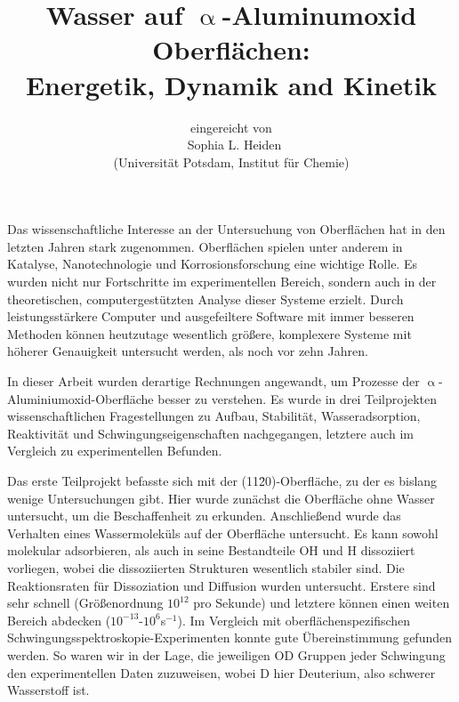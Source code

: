 \documentclass[11pt,DIV=13,a4paper,headinclude,german]{scrartcl}
\begin{document}
\titlehead{\centering\normalfont\large\scshape Allgemeinverständliche Zusammenfassung}
\title{\Large\vspace{-\baselineskip} Wasser auf $\upalpha$-Aluminumoxid Oberflächen:\\
  Energetik, Dynamik and Kinetik\vspace{0\baselineskip}}
\author{\large\sffamily eingereicht von\\
  \Large\textbf\sffamily\ Sophia L. Heiden\\
  \large\sffamily (Universit\"{a}t Potsdam, Institut f\"{u}r Chemie)}
\date{}
\maketitle
\vspace{-1cm}
Das wissenschaftliche Interesse an der Untersuchung von Oberflächen hat in den letzten Jahren stark zugenommen.
Oberflächen spielen unter anderem in Katalyse, Nanotechnologie und Korrosionsforschung eine wichtige Rolle.
Es wurden nicht nur Fortschritte im experimentellen Bereich, sondern auch in der theoretischen, computergestützten Analyse dieser Systeme erzielt.
Durch leistungsstärkere Computer und ausgefeiltere Software mit immer besseren Methoden können heutzutage wesentlich größere, komplexere Systeme mit höherer Genauigkeit untersucht werden, als noch vor zehn Jahren.

In dieser Arbeit wurden derartige Rechnungen angewandt, um Prozesse der $\upalpha$-Aluminiumoxid-Oberfläche besser zu verstehen.
Es wurde in drei Teilprojekten wissenschaftlichen Fragestellungen zu Aufbau, Stabilität, Wasseradsorption, Reaktivität und Schwingungseigenschaften nachgegangen, letztere auch im Vergleich zu experimentellen Befunden.

Das erste Teilprojekt befasste sich mit der (11\=20)-Oberfläche, zu der es bislang wenige Untersuchungen gibt.
Hier wurde zunächst die Oberfläche ohne Wasser %
untersucht, um die Beschaffenheit zu erkunden.
Anschließend wurde das Verhalten eines Wassermoleküls auf der Oberfläche untersucht.
Es kann sowohl molekular adsorbieren, als auch in seine Bestandteile OH und H dissoziiert vorliegen, wobei die dissoziierten Strukturen wesentlich stabiler sind.
Die Reaktionsraten für Dissoziation und Diffusion wurden untersucht. Erstere sind sehr schnell (Größenordnung $10^{12}$ pro Sekunde) und letztere können einen weiten Bereich abdecken ($10^{-13}$-$10^6$s$^{-1}$).
Im Vergleich mit oberflächenspezifischen Schwin\-gungs\-spek\-tros\-ko\-pie-Experimenten konnte gute Übereinstimmung gefunden werden.
So waren wir in der Lage, die jeweiligen OD Gruppen jeder Schwingung den experimentellen Daten zuzuweisen, wobei D hier Deuterium, also schwerer Wasserstoff ist.
\end{document}
